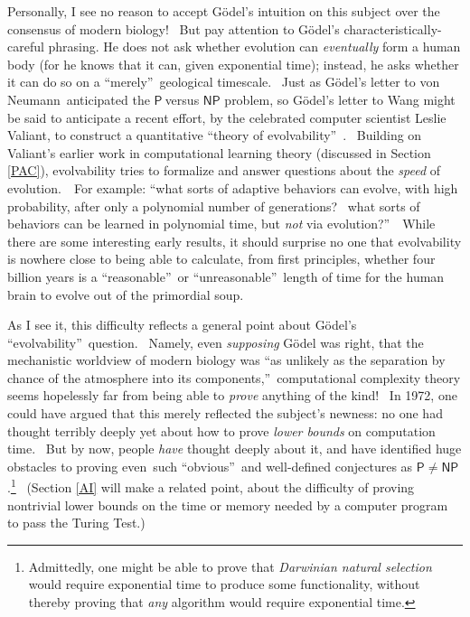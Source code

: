 \documentclass[12pt,onecolumn]{article}%
\begin{document}
Personally, I see no reason to accept G\"{o}del's intuition on this subject
over the consensus of modern biology! \ But pay attention to G\"{o}del's
characteristically-careful phrasing. He does not ask whether evolution can
\textit{eventually} form a human body (for he knows that it can, given
exponential time); instead, he asks whether it can do so on a
\textquotedblleft merely\textquotedblright\ geological\textit{ }timescale.
\ Just as G\"{o}del's letter to von Neumann\ anticipated the $\mathsf{P}%
\ $versus $\mathsf{NP}$ problem, so G\"{o}del's letter to Wang might be said
to anticipate a recent effort, by the celebrated computer scientist Leslie
Valiant, to construct a quantitative \textquotedblleft theory of
evolvability\textquotedblright\ \cite{valiant:evol}. \ Building on Valiant's
earlier work in computational learning theory (discussed in Section
\ref{PAC}), evolvability tries to formalize and answer questions about the
\textit{speed} of evolution.\ \ For example: \textquotedblleft what sorts of
adaptive behaviors can evolve, with high probability, after only a polynomial
number of generations? \ what sorts of behaviors can be learned in polynomial
time, but \textit{not} via evolution?\textquotedblright\ \ While there are
some interesting early results, it should surprise no one that evolvability is
nowhere close to being able to calculate, from first principles, whether four
billion years is a \textquotedblleft reasonable\textquotedblright\ or
\textquotedblleft unreasonable\textquotedblright\ length of time for the human
brain to evolve out of the primordial soup.

As I see it, this difficulty reflects a general point about G\"{o}del's
\textquotedblleft evolvability\textquotedblright\ question. \ Namely, even
\textit{supposing} G\"{o}del was right, that the mechanistic worldview of
modern biology was \textquotedblleft as unlikely as the separation by chance
of the atmosphere into its components,\textquotedblright\ computational
complexity theory seems hopelessly far from being able to \textit{prove}
anything of the kind! \ In 1972, one could have argued that this merely
reflected the subject's newness: no one had thought terribly deeply yet about
how to prove \textit{lower bounds} on computation time. \ But by now, people
\textit{have} thought deeply about it, and have identified huge obstacles to
proving even\ such \textquotedblleft obvious\textquotedblright\ and
well-defined conjectures as $\mathsf{P}\neq\mathsf{NP}$.\footnote{Admittedly,
one might be able to prove that \textit{Darwinian natural selection} would
require exponential time to produce some functionality, without thereby
proving that \textit{any} algorithm would require exponential time.}
\ (Section \ref{AI} will make a related point, about the difficulty of proving
nontrivial lower bounds on the time or memory needed by a computer program to
pass the Turing Test.)
\end{document}
